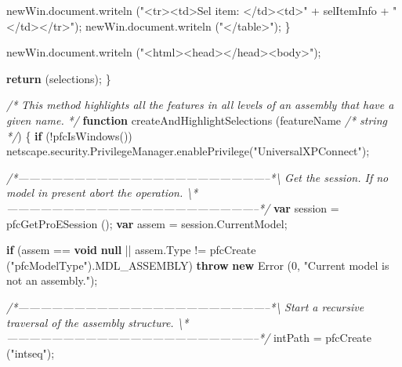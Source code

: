 \documentclass[]{article}
\newenvironment{Shaded}{}{}
\newcommand{\KeywordTok}[1]{\textcolor[rgb]{0.00,0.44,0.13}{\textbf{{#1}}}}
\newcommand{\DecValTok}[1]{\textcolor[rgb]{0.25,0.63,0.44}{{#1}}}
\newcommand{\StringTok}[1]{\textcolor[rgb]{0.25,0.44,0.63}{{#1}}}
\newcommand{\CommentTok}[1]{\textcolor[rgb]{0.38,0.63,0.69}{\textit{{#1}}}}
\newcommand{\OtherTok}[1]{\textcolor[rgb]{0.00,0.44,0.13}{{#1}}}
\newcommand{\FunctionTok}[1]{\textcolor[rgb]{0.02,0.16,0.49}{{#1}}}
\newcommand{\NormalTok}[1]{{#1}}
\begin{document}
\begin{Shaded}
\begin{Highlighting}[]
      \OtherTok{newWin}\NormalTok{.}\OtherTok{document}\NormalTok{.}\FunctionTok{writeln} \NormalTok{(}\StringTok{"<tr><td>Sel item: </td><td>"} \NormalTok{+}
                   \NormalTok{selItemInfo + }\StringTok{"</td></tr>"}\NormalTok{);}
      \OtherTok{newWin}\NormalTok{.}\OtherTok{document}\NormalTok{.}\FunctionTok{writeln} \NormalTok{(}\StringTok{"</table>"}\NormalTok{);}
    \NormalTok{\}}
  
  \OtherTok{newWin}\NormalTok{.}\OtherTok{document}\NormalTok{.}\FunctionTok{writeln} \NormalTok{(}\StringTok{"<html><head></head><body>"}\NormalTok{);}
  
  \KeywordTok{return} \NormalTok{(selections);}
\NormalTok{\}}


\CommentTok{/* }
\CommentTok{   This method highlights all the features in all levels of an assembly that have a given name. }
\CommentTok{*/}
\KeywordTok{function} \FunctionTok{createAndHighlightSelections} \NormalTok{(featureName }\CommentTok{/* string */}\NormalTok{)}
\NormalTok{\{}
  \KeywordTok{if} \NormalTok{(!}\FunctionTok{pfcIsWindows}\NormalTok{())}
    \OtherTok{netscape}\NormalTok{.}\OtherTok{security}\NormalTok{.}\OtherTok{PrivilegeManager}\NormalTok{.}\FunctionTok{enablePrivilege}\NormalTok{(}\StringTok{"UniversalXPConnect"}\NormalTok{);}
  
\CommentTok{/*--------------------------------------------------------------------*\textbackslash{} }
\CommentTok{  Get the session. If no model in present abort the operation. }
\CommentTok{\textbackslash{}*--------------------------------------------------------------------*/}  
  \KeywordTok{var} \NormalTok{session = }\FunctionTok{pfcGetProESession} \NormalTok{();}
  \KeywordTok{var} \NormalTok{assem = }\OtherTok{session}\NormalTok{.}\FunctionTok{CurrentModel}\NormalTok{;}
  
  \KeywordTok{if} \NormalTok{(assem == }\KeywordTok{void} \KeywordTok{null} \NormalTok{|| }
      \OtherTok{assem}\NormalTok{.}\FunctionTok{Type} \NormalTok{!= }\FunctionTok{pfcCreate} \NormalTok{(}\StringTok{"pfcModelType"}\NormalTok{).}\FunctionTok{MDL_ASSEMBLY}\NormalTok{)}
    \KeywordTok{throw} \KeywordTok{new} \FunctionTok{Error} \NormalTok{(}\DecValTok{0}\NormalTok{, }\StringTok{"Current model is not an assembly."}\NormalTok{);}
  
\CommentTok{/*--------------------------------------------------------------------*\textbackslash{} }
\CommentTok{  Start a recursive traversal of the assembly structure. }
\CommentTok{\textbackslash{}*--------------------------------------------------------------------*/} 
  \NormalTok{intPath = }\FunctionTok{pfcCreate} \NormalTok{(}\StringTok{"intseq"}\NormalTok{);}
  

\end{Highlighting}
\end{Shaded}
\end{document}
